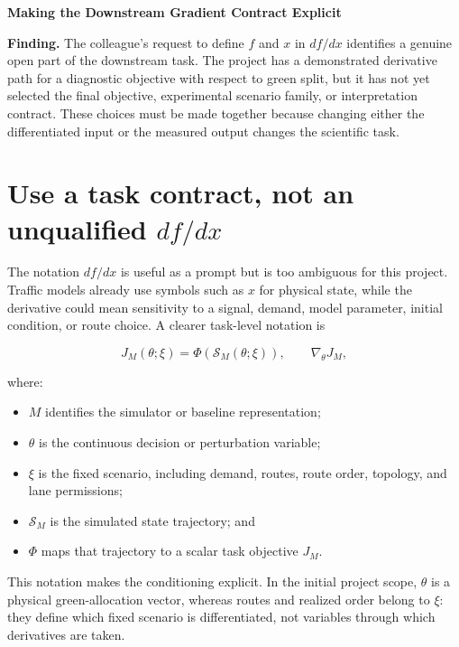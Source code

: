 \documentclass[11pt,a4paper]{article}
\newcommand{\finding}[1]{\begin{center}\colorbox{bluegray}{\parbox{0.93\linewidth}{\textbf{Finding.} #1}}\end{center}}
\begin{document}
\begin{center}
{\LARGE\bfseries Making the Downstream Gradient Contract Explicit\par}
\end{center}

\finding{The colleague's request to define $f$ and $x$ in $df/dx$ identifies a genuine open part of the downstream task. The project has a demonstrated derivative path for a diagnostic objective with respect to green split, but it has not yet selected the final objective, experimental scenario family, or interpretation contract. These choices must be made together because changing either the differentiated input or the measured output changes the scientific task.}

\section{Use a task contract, not an unqualified $df/dx$}

The notation $df/dx$ is useful as a prompt but is too ambiguous for this project. Traffic models already use symbols such as $x$ for physical state, while the derivative could mean sensitivity to a signal, demand, model parameter, initial condition, or route choice. A clearer task-level notation is

\begin{equation}
  J_M(\theta;\xi)=\Phi\!\left(\mathcal{S}_M(\theta;\xi)\right),
  \qquad
  \nabla_{\theta}J_M,
\end{equation}

where:

\begin{itemize}
  \item $M$ identifies the simulator or baseline representation;
  \item $\theta$ is the continuous decision or perturbation variable;
  \item $\xi$ is the fixed scenario, including demand, routes, route order, topology, and lane permissions;
  \item $\mathcal{S}_M$ is the simulated state trajectory; and
  \item $\Phi$ maps that trajectory to a scalar task objective $J_M$.
\end{itemize}

This notation makes the conditioning explicit. In the initial project scope, $\theta$ is a physical green-allocation vector, whereas routes and realized order belong to $\xi$: they define which fixed scenario is differentiated, not variables through which derivatives are taken.
\end{document}
